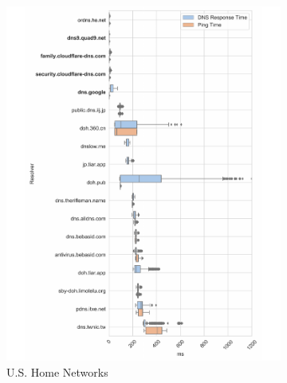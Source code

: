 \begin{figure}[h!]
\centering
%
\begin{subfigure}[b]{0.4\textwidth}
\includegraphics[width=\textwidth]{figures/poah_asia.pdf}
\caption{U.S. Home Networks}
\end{subfigure}
%
\begin{subfigure}[b]{0.4\textwidth}

\end{subfigure}
\end{figure}
